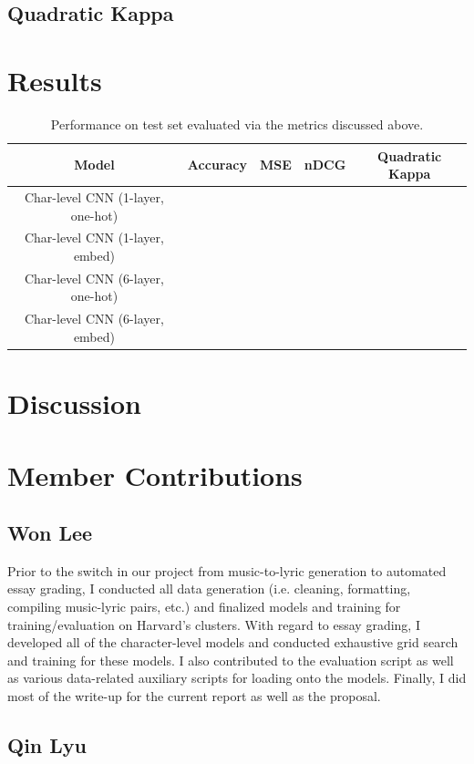 \documentclass[10pt,psamsfonts]{amsart}
\theoremstyle{definition}
\theoremstyle{remark}
\numberwithin{equation}{section}
\begin{document}
\subsection*{Quadratic Kappa}

\section*{Results}

\begin{table}
	\begin{tabular}{c|c|c|c|c}
		Model & Accuracy & MSE & nDCG & Quadratic Kappa\\\hline
		Char-level CNN (1-layer, one-hot) & & & & \\
		Char-level CNN (1-layer, embed) &  & & & \\
		Char-level CNN (6-layer, one-hot) & & & & \\
		Char-level CNN (6-layer, embed) & & & & \\
	\end{tabular}
	\caption{Performance on test set evaluated via the metrics discussed above.}
\end{table}

\section*{Discussion}

\section*{Member Contributions}

\subsection*{Won Lee}

Prior to the switch in our project from music-to-lyric generation to automated essay grading, I conducted all data generation (i.e. cleaning, formatting, compiling music-lyric pairs, etc.) and finalized models and training for training/evaluation on Harvard's clusters. With regard to essay grading, I developed all of the character-level models and conducted exhaustive grid search and training for these models. I also contributed to the evaluation script as well as various data-related auxiliary scripts for loading onto the models. Finally, I did most of the write-up for the current report as well as the proposal.

\subsection*{Qin Lyu}
\end{document}
